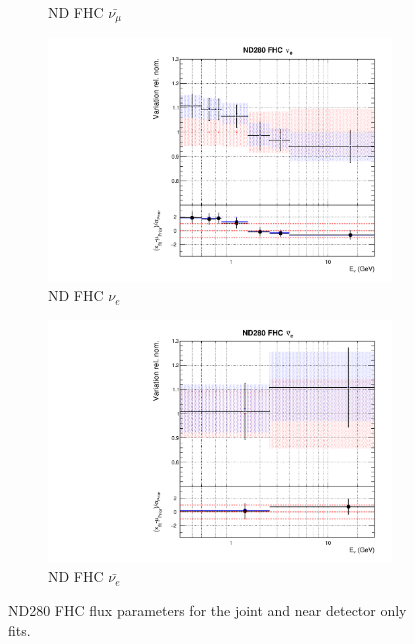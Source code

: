 \begin{figure}[!htbp]
\begin{subfigure}{0.49\textwidth}
  \caption{ND FHC $\bar{\nu_{\mu}}$}
\end{subfigure}
\begin{subfigure}{0.49\textwidth}
  \centering
  \includegraphics[width=0.99\linewidth]{figs/jointflux2}
  \caption{ND FHC $\nu_{e}$}
\end{subfigure}
\begin{subfigure}{0.49\textwidth}
  \centering
  \includegraphics[width=0.99\linewidth]{figs/jointflux3}
  \caption{ND FHC $\bar{\nu_{e}}$}
\end{subfigure}
\caption{ND280 FHC flux parameters for the joint and near detector only fits.}
\label{fig:jointfluxND}
\end{figure}

